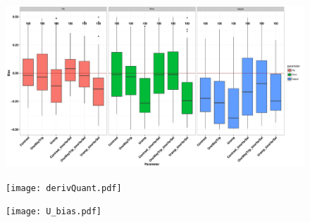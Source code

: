 \documentclass{fancyslides}
\begin{document}







\begin{frame}
\begin{center} %
\begin{figure}               
                \includegraphics[trim= 0mm 0mm 0mm 0mm,width=\linewidth, scale=0.5]{main_params.pdf}  
\end{figure}
\end{center}
\end{frame}


\begin{frame}
\begin{center} %
\begin{figure}               
                \texttt{[image: derivQuant.pdf]}  
\end{figure}
\end{center}
\end{frame}



\begin{frame}
\begin{center} %
\begin{figure}               
                \texttt{[image: U\_bias.pdf]}  
\end{figure}
\end{center}
\end{frame}
\end{document}
